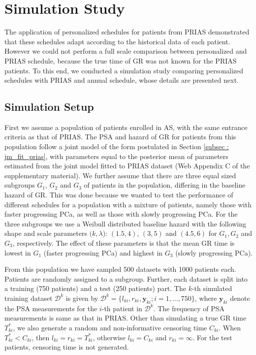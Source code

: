 \section{Simulation Study}
\label{sec: simulation_study}
The application of personalized schedules for patients from PRIAS demonstrated that these schedules adapt according to the historical data of each patient. However we could not perform a full scale comparison between personalized and PRIAS schedule, because the true time of GR was not known for the PRIAS patients. To this end, we conducted a simulation study comparing personalized schedules with PRIAS and annual schedule, whose details are presented next.

\subsection{Simulation Setup}
\label{subsec : simulation_setup}
First we assume a population of patients enrolled in AS, with the same entrance criteria as that of PRIAS. The PSA and hazard of GR for patients from this population follow a joint model of the form postulated in Section \ref{subsec : jm_fit_prias}, with parameters equal to the posterior mean of parameters estimated from the joint model fitted to PRIAS dataset (Web Appendix C of the supplementary material). We further assume that there are three equal sized subgroups $G_1$, $G_2$ and $G_3$ of patients in the population, differing in the baseline hazard of GR. This was done because we wanted to test the performance of different schedules for a population with a mixture of patients, namely those with faster progressing PCa, as well as those with slowly progressing PCa. For the three subgroups we use a Weibull distributed baseline hazard with the following shape and scale parameters $(k, \lambda$): $(1.5, 4)$, $(3, 5)$ and $(4.5, 6)$ for $G_1, G_2$ and $G_3$, respectively. The effect of these parameters is that the mean GR time is lowest in $G_1$ (faster progressing PCa) and highest in $G_3$ (slowly progressing PCa).

From this population we have sampled 500 datasets with 1000 patients each. Patients are randomly assigned to a subgroup. Further, each dataset is split into a training (750 patients) and a test (250 patients) part. The $k$-th simulated training dataset $\mathcal{D}^k$ is given by $\mathcal{D}^k = \{l_{ki}, r_{ki}, \boldsymbol{y}_{ki}; i = 1, \ldots, 750\}$, where $\boldsymbol{y}_{ki}$ denote the PSA measurements for the $i$-th patient in $\mathcal{D}^k$. The frequency of PSA measurements is same as that in PRIAS. Other than simulating a true GR time $T^*_{ki}$, we also generate a random and non-informative censoring time $C_{ki}$. When $T^*_{ki} < C_{ki}$, then $l_{ki} = r_{ki} = T^*_{ki}$, otherwise $l_{ki} = C_{ki}$ and $r_{ki} = \infty$. For the test patients, censoring time is not generated.

